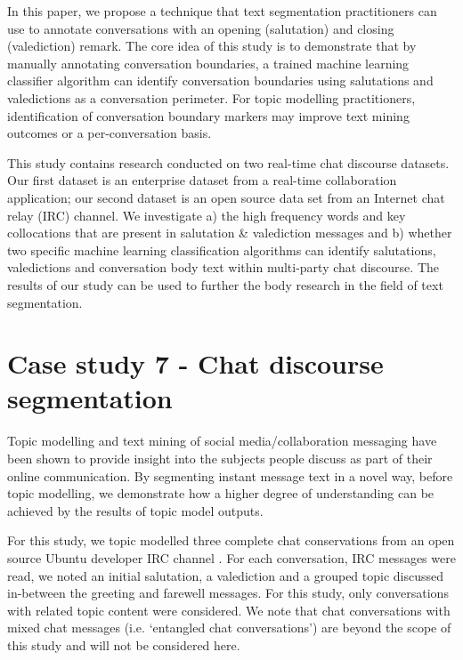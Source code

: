 In this paper, we propose a technique that text segmentation practitioners can use to annotate conversations with an opening (salutation) and closing (valediction) remark. The core idea of this study is to demonstrate that by manually annotating conversation boundaries, a trained machine learning classifier algorithm can identify conversation boundaries using salutations and valedictions as a conversation perimeter. For topic modelling practitioners, identification of conversation boundary markers may improve text mining outcomes or a per-conversation basis.

This study contains research conducted on two real-time chat discourse datasets. Our first dataset is an enterprise dataset from a real-time collaboration application; our second dataset is an open source data set from an Internet chat relay (IRC) channel. We investigate a) the high frequency words and key collocations that are present in salutation \& valediction messages and b) whether two specific machine learning classification algorithms can identify salutations, valedictions and conversation body text within multi-party chat discourse. The results of our study can be used to further the body research in the field of text segmentation.


\section{Case study 7 - Chat discourse segmentation}

Topic modelling and text mining of social media/collaboration messaging have been shown to provide insight into the subjects people discuss as part of their online communication. By segmenting instant message text in a novel way, before topic modelling, we demonstrate how a higher degree of understanding can be achieved by the results of topic model outputs. 

For this study, we topic modelled three complete chat conservations from an open source Ubuntu developer IRC channel \cite{irclogs}. For each conversation, IRC messages were read, we noted an initial salutation, a valediction and a grouped topic discussed in-between the greeting and farewell messages. For this study, only conversations with related topic content were considered. We note that chat conversations with mixed chat messages (i.e. `entangled chat conversations') are beyond the scope of this study and will not be considered here. 

